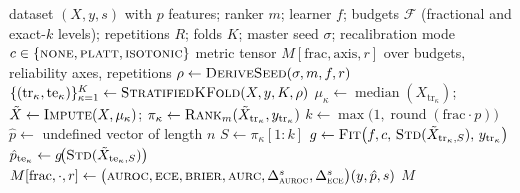 \documentclass[fleqn,10pt]{wlscirep}
\begin{document}
\begin{algorithm}[t]
\caption{\textsc{CertifyFeatureReduction}: leakage-safe per-configuration evaluation.}
\label{alg:certify}
\begin{algorithmic}[1]
\Require dataset $(X,y,s)$ with $p$ features; ranker $m$; learner $f$; budgets $\mathcal{F}$
  (fractional and exact-$k$ levels); repetitions $R$; folds $K$; master seed $\sigma$;
  recalibration mode $c\in\{\textsc{none},\textsc{platt},\textsc{isotonic}\}$
\Ensure metric tensor $M[\mathrm{frac},\text{axis},r]$ over budgets, reliability axes, repetitions
  \State $\rho \gets \textsc{DeriveSeed}(\sigma, m, f, r)$ 
  \State $\{(\mathrm{tr}_\kappa,\mathrm{te}_\kappa)\}_{\kappa=1}^{K} \gets \textsc{StratifiedKFold}(X,y,K,\rho)$
   
    \State $\mu_\kappa \gets \operatorname{median}(X_{\mathrm{tr}_\kappa})$;\quad
      $\tilde X \gets \textsc{Impute}(X,\mu_\kappa)$;\quad
      $\pi_\kappa \gets \textsc{Rank}_m(\tilde X_{\mathrm{tr}_\kappa}, y_{\mathrm{tr}_\kappa})$
  \EndFor
    \State $k \gets \max\!\big(1,\operatorname{round}(\mathrm{frac}\cdot p)\big)$
    \State $\hat p \gets$ undefined vector of length $n$
      \State $S \gets \pi_\kappa[1{:}k]$ 
      \State $g \gets \textsc{Fit}\big(f, c,\, \textsc{Std}(\tilde X_{\mathrm{tr}_\kappa,S}),\, y_{\mathrm{tr}_\kappa}\big)$
      \State $\hat p_{\mathrm{te}_\kappa} \gets g\!\big(\textsc{Std}(\tilde X_{\mathrm{te}_\kappa,S})\big)$
    \EndFor
    \State $M[\mathrm{frac},\cdot,r] \gets
      \big(\textsc{auroc},\textsc{ece},\textsc{brier},\textsc{aurc},\Delta^{s}_{\textsc{auroc}},
      \Delta^{s}_{\textsc{ece}}\big)(y,\hat p,s)$
  \EndFor
\EndFor
\State \Return $M$
\end{algorithmic}
\end{algorithm}
\end{document}
